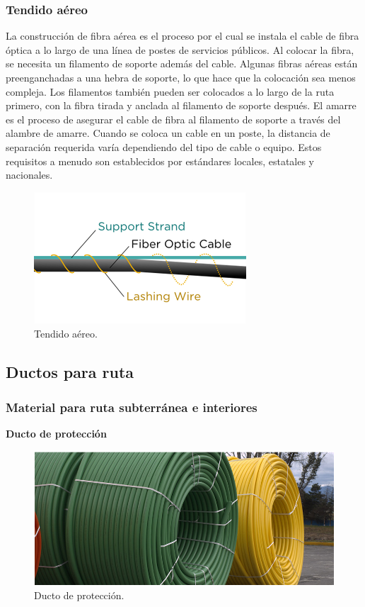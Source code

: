 \documentclass[12pt,letterpaper]{article}
\begin{document}
\subsubsection{Tendido aéreo}
La construcción de fibra aérea es el proceso por el cual se instala el cable de fibra 
óptica a lo largo de una línea de postes de servicios públicos. Al colocar la fibra, se 
necesita un filamento de soporte además del cable. Algunas fibras aéreas están 
preenganchadas a una hebra de soporte, lo que hace que la colocación sea menos compleja. 
Los filamentos también pueden ser colocados a lo largo de la ruta primero, con la fibra 
tirada y anclada al filamento de soporte después. El amarre es el proceso de asegurar el 
cable de fibra al filamento de soporte a través del alambre de amarre. Cuando se coloca 
un cable en un poste, la distancia de separación requerida varía dependiendo del tipo de 
cable o equipo. Estos requisitos a menudo son establecidos por estándares locales, 
estatales y nacionales.
\begin{figure}[ht]
    \centering
    \includegraphics[width=.5\textwidth]{f12.png}
    \caption{Tendido aéreo.}
\end{figure}

\newpage
\subsection{Ductos para ruta}
\subsubsection{Material para ruta subterránea e interiores}
\textbf{Ducto de protección}
\\
\begin{figure}[ht]
    \centering
    \includegraphics[width=.5\textwidth]{f30.png}
    \caption{Ducto de protección.}
\end{figure}
\end{document}
